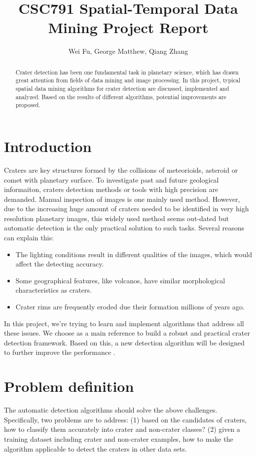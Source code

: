 \documentclass[conference]{IEEEtran}
\begin{document}
\title{CSC791 Spatial-Temporal Data Mining Project Report}
\author{Wei Fu, George Matthew, Qiang Zhang} 

\maketitle
\begin{abstract}
  Crater detection has been one fundamental task in planetary science, which has drawn great attention from fields of data mining and image processing. In this project,  typical spatial data mining algorithms for crater detection are discussed, implemented and analyzed. Based on the results of different algorithms, potential improvements are proposed.
\end{abstract}
\section{Introduction}
Craters are key structures formed by the collisions of meteorioids, asteroid or comet with planetary surface. To investigate past and future geological informaiton, craters detection methods or tools with high precision are demanded. Manual inspection of images is one mainly used method. However, due to the increasing huge amount of craters needed to be identified in very high resolution planetary images, this widely used method seems out-dated but automatic detection is the only practical solution to such tasks. Several reasons \cite{kim2005automated} can explain this:
\begin{itemize}
 \item The lighting conditions result in different qualities of the images, which would affect the detecting accuracy.
 \item Some geographical features, like volcanos, have similar morphological characteristics as craters.
 \item Crater rims are frequently eroded due their formation millions of years ago. 
\end{itemize}

In this project, we're trying to learn and implement algorithms that address all these issues. 
We choose \cite{ding2011subkilometer} as a main reference to build a robust and practical crater detection framework. Based on this, a new detection algorithm will be designed to further improve the performance .

\section{Problem definition}
The automatic detection algorithms should solve the above challenges. Specifically, two problems are to address: (1) based on the candidates of craters, how to classify them accurately into crater and non-crater classes? (2) given a training dataset including crater and non-crater examples, how to make the algorithm applicable to detect the craters in other data sets.
\end{document}
